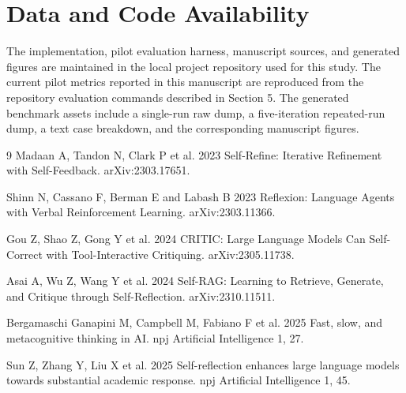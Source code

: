 \documentclass[12pt]{article}
\begin{document}
\section*{Data and Code Availability}

The implementation, pilot evaluation harness, manuscript sources, and generated figures are maintained in the local project repository used for this study. The current pilot metrics reported in this manuscript are reproduced from the repository evaluation commands described in Section 5. The generated benchmark assets include a single-run raw dump, a five-iteration repeated-run dump, a text case breakdown, and the corresponding manuscript figures.

\begin{thebibliography}{9}
Madaan A, Tandon N, Clark P et al. 2023 Self-Refine: Iterative Refinement with Self-Feedback. arXiv:2303.17651.

Shinn N, Cassano F, Berman E and Labash B 2023 Reflexion: Language Agents with Verbal Reinforcement Learning. arXiv:2303.11366.

Gou Z, Shao Z, Gong Y et al. 2024 CRITIC: Large Language Models Can Self-Correct with Tool-Interactive Critiquing. arXiv:2305.11738.

Asai A, Wu Z, Wang Y et al. 2024 Self-RAG: Learning to Retrieve, Generate, and Critique through Self-Reflection. arXiv:2310.11511.

Bergamaschi Ganapini M, Campbell M, Fabiano F et al. 2025 Fast, slow, and metacognitive thinking in AI. npj Artificial Intelligence 1, 27.

Sun Z, Zhang Y, Liu X et al. 2025 Self-reflection enhances large language models towards substantial academic response. npj Artificial Intelligence 1, 45.
\end{thebibliography}
\end{document}

